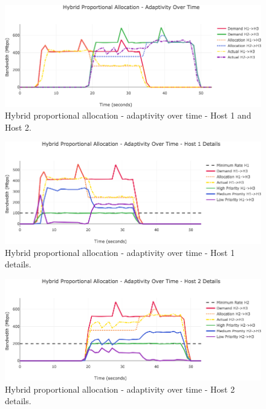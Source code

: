 \documentclass[accepted,single]{gipaper}
\begin{document}
\begin{figure}
	\centering
	\includegraphics[width=6in]{figs/dbah_ot_udp_both.png}
	\caption{ Hybrid proportional allocation - adaptivity over time - Host 1 and Host 2. } \label{dbah_ot_both}
\end{figure}

\begin{figure}
	\centering
	\includegraphics[width=6in]{figs/dbah_ot_udp_h1.png}
	\caption{ Hybrid proportional allocation - adaptivity over time - Host 1 details. } \label{dpah_ot_h1}
\end{figure}

\begin{figure}
	\centering
	\includegraphics[width=6in]{figs/dbah_ot_udp_h2.png}
	\caption{ Hybrid proportional allocation - adaptivity over time - Host 2 details. } \label{dbah_ot_h2}
\end{figure}
\end{document}
